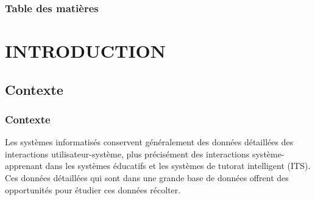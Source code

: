 \documentclass[aspectratio=169,professionalfonts, 12pt]{beamer}
\date{\today}
\begin{document}
\begin{frame}
	\titlepage
\end{frame}
\begin{frame}
	\frametitle{Table des matières}
    \begin{multicols}{2}
    \tableofcontents
    \end{multicols}
\end{frame}

\section{INTRODUCTION}

\subsection{Contexte}

\begin{frame}
  \frametitle{Contexte}
  \justifying 
  \begin{minipage}{\textwidth}
  \begin{block}{}
  Les systèmes informatisés conservent généralement des données détaillées des interactions utilisateur-système, plus précisément des interactions système-apprenant dans les systèmes éducatifs et les systèmes de tutorat intelligent (ITS). Ces données détaillées qui sont dans une grande base de données offrent des opportunités pour étudier ces données récolter.  
  \end{block}
  \end{minipage}
\end{frame}

\end{document}
